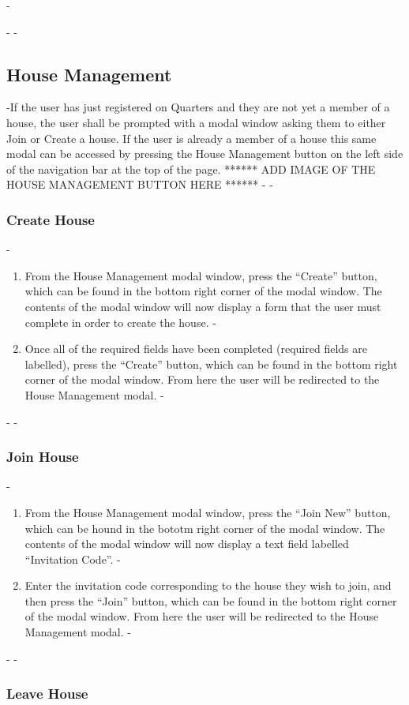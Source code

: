 -\documentclass[12pt]{article}
\begin{document}
 -
 -\subsection{House Management} %
 -If the user has just registered on Quarters and they are not yet a member of a house, the user shall be prompted with a modal window asking them to either Join or Create a house. If the user is already a member of a house this same modal can be accessed by pressing the House Management button on the  left side of the navigation bar at the top of the page. ****** ADD IMAGE OF THE HOUSE MANAGEMENT BUTTON HERE ******
 -
 -\subsubsection{Create House}
 -\begin{enumerate}
 -\item From the House Management modal window, press the ``Create'' button, which can be found in the bottom right corner of the modal window. The contents of the modal window will now display a form that the user must complete in order to create the house.
 -\item Once all of the required fields have been completed (required fields are labelled), press the ``Create'' button, which can be found in the bottom right corner of the modal window. From here the user will be redirected to the House Management modal.
 -\end{enumerate}
 -
 -\subsubsection{Join House}
 -\begin{enumerate}
 -\item From the House Management modal window, press the ``Join New'' button, which can be hound in the bototm right corner of the modal window. The contents of the modal window will now display a text field labelled ``Invitation Code''.
 -\item Enter the invitation code corresponding to the house they wish to join, and then press the ``Join'' button, which can be found in the bottom right corner of the modal window. From here the user will be redirected to the House Management modal.
 -\end{enumerate}
 -
 -\subsubsection{Leave House}
\end{document}
